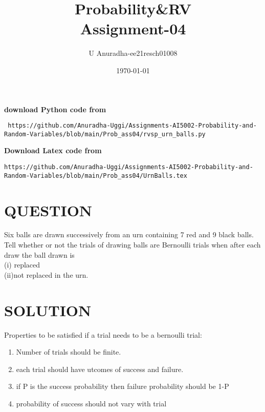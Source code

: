 \documentclass[journal,12pt,twocolumn]{IEEEtran}
\title{Probability\&RV \\ Assignment-04}
\author{U Anuradha-ee21resch01008}
\date{\today}
\begin{document}
\maketitle
\newpage
\bigskip
\renewcommand{\thefigure}{\theenumi}
\renewcommand{\thetable}{\theenumi}
\textbf{download Python code from}
\begin{lstlisting}
 https://github.com/Anuradha-Uggi/Assignments-AI5002-Probability-and-Random-Variables/blob/main/Prob_ass04/rvsp_urn_balls.py
\end{lstlisting}
\textbf{Download Latex code from}
\begin{lstlisting}
https://github.com/Anuradha-Uggi/Assignments-AI5002-Probability-and-Random-Variables/blob/main/Prob_ass04/UrnBalls.tex
\end{lstlisting}
\section{\textbf{QUESTION}}
Six balls are drawn successively from an
urn containing 7 red and 9 black balls. Tell
whether or not the trials of drawing balls are
Bernoulli trials when after each draw the ball
drawn is\\
(i) replaced\\
(ii)not replaced in the urn.
\section{\textbf{SOLUTION}}
Properties to be satisfied if a trial needs to be a bernoulli trial:\\
\begin{enumerate}
    \item Number of trials should be finite.
    \item each trial should have utcomes of success and failure.\
    \item if P is the success probability then failure probability should be 1-P
    \item probability of success should not vary with trial
\end{enumerate}
\end{document}
